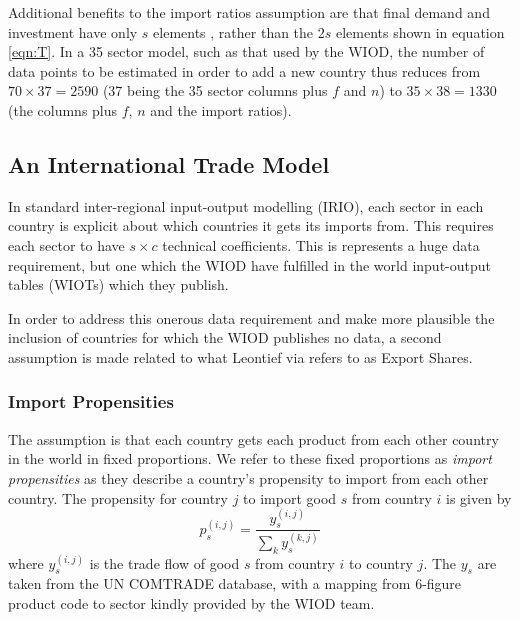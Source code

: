 \documentclass[a4paper]{article}
\begin{document}
\noindent Additional benefits to the import ratios assumption are that final demand and investment have only $s$ elements , rather than the $2s$ elements shown in equation \eqref{eqn:T}.
In a 35 sector model, such as that used by the WIOD, the number of data points to be estimated in order to add a new country thus reduces from $70 \times 37 = 2590$ (37 being the 35 sector columns plus $f$ and $n$) to $35 \times 38 = 1330$ (the columns plus $f$, $n$ and the import ratios).

\subsection{An International Trade Model}\label{sec:trade}
In standard inter-regional input-output modelling (IRIO), each sector in each country is explicit about which countries it gets its imports from. 
This requires each sector to have $s \times c$ technical coefficients.
This is represents a huge data requirement, but one which the WIOD have fulfilled in the world input-output tables (WIOTs) which they publish.

In order to address this onerous data requirement and make more plausible the inclusion of countries for which the WIOD publishes no data, a second assumption is made related to what Leontief via \textcite{Duchin2004} refers to as Export Shares.

\subsubsection*{Import Propensities}
The assumption is that each country gets each product from each other country in the world in fixed proportions.
We refer to these fixed proportions as \textit{import propensities} as they describe a country's propensity to import from each other country. The propensity for country $j$ to import good $s$ from country $i$ is given by
\begin{equation}
p^{(i,j)}_s = \frac{y^{(i,j)}_s}{\sum_k{y^{(k,j)}_s}}
\end{equation}
where $y^{(i,j)}_s$ is the trade flow of good $s$ from country $i$ to country $j$. The $y_s$ are taken from the UN COMTRADE database, with a mapping from 6-figure product code to sector kindly provided by the WIOD team.
\end{document}
